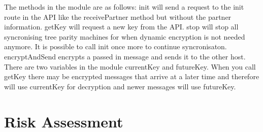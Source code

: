 The methods in the module are as follows:
init will send a request to the init route in the API like the receivePartner method but without the partner information.
getKey will request a new key from the API.
stop will stop all syncronising tree parity machines for when dynamic encryption is not needed anymore. It is possible to call init once more to continue syncronisaton. 
encryptAndSend encrypts a passed in message and sends it to the other host.
There are two variables in the module currentKey and futureKey. When you call getKey there may be encrypted messages that arrive at a later time and therefore will use currentKey for decryption and newer messages will use futureKey.   


























\section{Risk Assessment}



